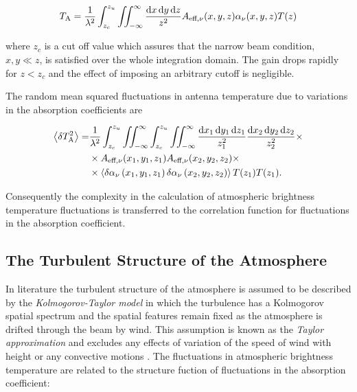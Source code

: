 \begin{equation}
        T_\text{A} = \frac{1}{\lambda^2} \int^{z_u}_{z_c}
        \iint^\infty_{-\infty} \frac{\dd{x}\dd{y}\dd{z}}{z^2}
        A_{\text{eff},\nu}\qty(x,y,z)
        \alpha_\nu\qty(x,y,z) T\qty(z)
        \label{eq:fluctuations_t_antenna}
\end{equation}

where $z_c$ is a cut off value which assures that the narrow beam
condition, $x,y \ll z$, is satisfied over the whole integration domain.
The gain drops rapidly for $z < z_c$ and the effect of imposing an
arbitrary cutoff is negligible.

The random mean squared fluctuations in antenna temperature due to variations in
the absorption coefficients are

\begin{equation}
        \begin{split}
                \expval{\var{T^2_\text{A}}} = & \frac{1}{\lambda^2}
                \int^{z_u}_{z_c}\iint^\infty_{-\infty}
                \int^{z_u}_{z_c}\iint^\infty_{-\infty}
                \frac{\dd{x_1}\dd{y_1}\dd{z_1}}{z^2_1}
                \frac{\dd{x_2}\dd{y_2}\dd{z_2}}{z^2_2} \times \\
                & \times A_{\text{eff},\nu}\qty(x_1,y_1,z_1)
                A_{\text{eff},\nu}\qty(x_2,y_2,z_2) \times \\
                & \times \expval{\var{\alpha_\nu}\qty(x_1,y_1,z_1)
                \var{\alpha_\nu}\qty(x_2,y_2,z_2)}
                T\qty(z_1)T\qty(z_1).
        \end{split}
        \label{eq:rms_t_antenna}
\end{equation}

Consequently the complexity in the calculation of atmospheric brightness
temperature fluctuations is transferred to the correlation function for
fluctuations in the absorption coefficient.

\subsection{The Turbulent Structure of the Atmosphere}\label{ss:turbulent_structure}

In literature the turbulent structure of the atmosphere is assumed to be
described by the \emph{Kolmogorov-Taylor model} in which the turbulence has
a Kolmogorov spatial spectrum and the spatial features remain fixed as the
atmosphere is drifted through the beam by wind. This assumption is
known as the \emph{Taylor approximation} and excludes any effects of
variation of the speed of wind with height or any convective motions
\autocite{church1995predicting}.
The fluctuations in atmospheric brightness temperature are related to the
structure fuction of fluctuations in the absorption coefficient:

